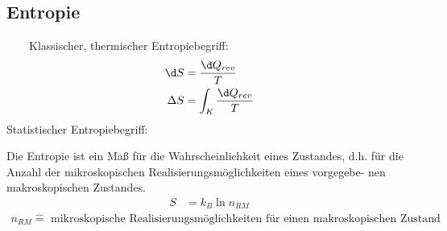 \documentclass[twocolumn]{summery_3.1}
\begin{document}
\subsection{Entropie}{
    \ \ \ \ Klassischer, thermischer Entropiebegriff:
    \begin{align*}
        \d S &= \frac{\d Q_{rev}}{T} \\
        \Delta S &= \int_K \frac{\d Q_{rev}}{T} 
    \end{align*}
    Statistischer Entropiebegriff:

    Die Entropie ist ein Maß für die Wahrscheinlichkeit eines Zustandes, d.h. für
    die Anzahl der mikroskopischen Realisierungsmöglichkeiten eines vorgegebe-
    nen makroskopischen Zustandes.
    \begin{align*}
        S &= k_B \ln n_{RM}
    \end{align*}
    \begin{align*}
        n_{RM} \hat{=} \text{ mikroskopische Realisierungsmöglichkeiten für einen makroskopischen Zustand}
    \end{align*}
}
\end{document}
